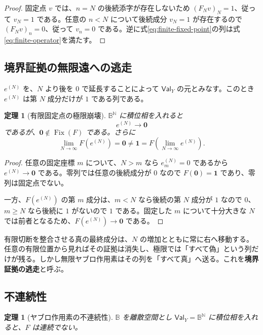 \documentclass[a4paper,11pt]{ltjsarticle}
\theoremstyle{definition}
\theoremstyle{plain}
\newtheorem{theorem}[definition]{定理}
\newcommand{\Val}{\mathsf{Val}}
\newcommand{\Fix}{\operatorname{Fix}}
\newcommand{\Bool}{\mathbb B}
\newcommand{\N}{\mathbb N}
\begin{document}
\begin{proof}
固定点 $v$ では、$n=N$ の後続添字が存在しないため $(F_Nv)_N=1$、従って $v_N=1$ である。任意の $n<N$ について後続成分 $v_N=1$ が存在するので $(F_Nv)_n=0$、従って $v_n=0$ である。逆に式\eqref{eq:finite-fixed-point}の列は式\eqref{eq:finite-operator}を満たす。
\end{proof}

\subsection{境界証拠の無限遠への逃走}

$e^{(N)}$ を、$N$ より後を $0$ で延長することによって $\Val_Y$ の元とみなす。このとき $e^{(N)}$ は第 $N$ 成分だけが $1$ である列である。

\begin{theorem}[有限固定点の極限崩壊]
$\Bool^{\N}$ に積位相を入れると
\begin{equation}
 e^{(N)}\longrightarrow \boldsymbol 0
 \end{equation}
であるが、$\boldsymbol 0\notin\Fix(F)$ である。さらに
\begin{equation}
 \lim_{N\to\infty}F(e^{(N)})=\boldsymbol 0
 \neq
 \boldsymbol 1=F\left(\lim_{N\to\infty}e^{(N)}\right).
 \label{eq:noncommuting-limit}
\end{equation}
\end{theorem}

\begin{proof}
任意の固定座標 $m$ について、$N>m$ なら $e^{(N)}_m=0$ であるから $e^{(N)}\to\boldsymbol 0$ である。零列では任意の後続成分が $0$ なので $F(\boldsymbol 0)=\boldsymbol 1$ であり、零列は固定点でない。

一方、$F(e^{(N)})$ の第 $m$ 成分は、$m<N$ なら後続の第 $N$ 成分が $1$ なので $0$、$m\geq N$ なら後続に $1$ がないので $1$ である。固定した $m$ について十分大きな $N$ では前者となるため、$F(e^{(N)})\to\boldsymbol 0$ である。
\end{proof}

有限切断を整合させる真の最終成分は、$N$ の増加とともに常に右へ移動する。任意の有限位置から見ればその証拠は消失し、極限では「すべて偽」という列だけが残る。しかし無限ヤブロ作用素はその列を「すべて真」へ送る。これを\textbf{境界証拠の逃走}と呼ぶ。

\subsection{不連続性}

\begin{theorem}[ヤブロ作用素の不連続性]
$\Bool$ を離散空間とし $\Val_Y=\Bool^{\N}$ に積位相を入れると、$F$ は連続でない。
\end{theorem}
\end{document}
